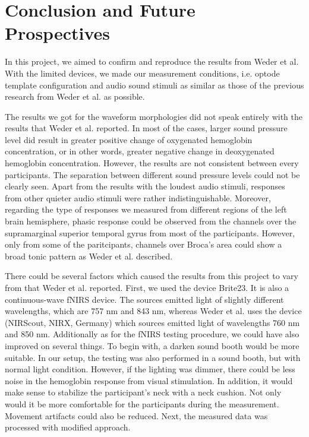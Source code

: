 \chapter{Conclusion and Future Prospectives}
In this project, we aimed to confirm and reproduce the results from Weder et al. With the limited devices, we made our measurement conditions, i.e. optode template configuration and audio sound stimuli as similar as those of the previous research from Weder et al. as possible.

The results we got for the waveform morphologies did not speak entirely with the results that Weder et al. reported. In most of the cases, larger sound pressure level did result in greater positive change of oxygenated hemoglobin concentration, or in other words, greater negative change in deoxygenated hemoglobin concentration. However, the results are not consistent between every participants. The separation between different sound pressure levels could not be clearly seen. Apart from the results with the loudest audio stimuli, responses from other quieter audio stimuli were rather indistinguishable. Moreover, regarding the type of responses we measured from different regions of the left brain hemisphere, phasic response could be observed from the channels over the supramarginal superior temporal gyrus from most of the participants. However, only from some of the paritcipants, channels over Broca's area could show a broad tonic pattern as Weder et al. described.

There could be several factors which caused the results from this project to vary from that Weder et al. reported. First, we used the device Brite23. It is also a continuous-wave fNIRS device. The sources emitted light of slightly different wavelengths, which are 757 nm and 843 nm, whereas Weder et al. uses the device (NIRScout, NIRX, Germany) which sources emitted light of wavelengths 760 nm and 850 nm. Additionally as for the fNIRS testing procedure, we could have also improved on several things. To begin with, a darken sound booth would be more suitable. In our setup, the testing was also performed in a sound booth, but with normal light condition. However, if the lighting was dimmer, there could be less noise in the hemoglobin response from visual stimulation. In addition, it would make sense to stabilize the participant's neck with a neck cushion. Not only would it be more comfortable for the participants during the measurement. Movement artifacts could also be reduced. Next, the measured data was processed with modified approach.

